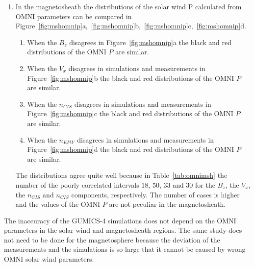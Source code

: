 \documentclass[linenumbers,draft]{agujournal}
\begin{document}
\begin{enumerate}
\item In the magnetosheath the distributions of the solar wind P calculated from OMNI parameters can be compared in Figure~\ref{fig:mshomnip}a,~\ref{fig:mshomnip}b,~\ref{fig:mshomnip}c,~\ref{fig:mshomnip}d.
\begin{enumerate}
\item When the $B_{z}$ disagrees in Figure~\ref{fig:mshomnip}a the black and red distributions of the OMNI $P$ are similar.

\item When the $V_{x}$ disagrees in simulations and measurements in Figure~\ref{fig:mshomnip}b the black and red distributions of the OMNI $P$ are similar.

\item When the $n_{CIS}$ disagrees in simulations and measurements in Figure~\ref{fig:mshomnip}c the black and red distributions of the OMNI $P$ are similar.

\item When the $n_{EFW}$ disagrees in simulations and measurements in Figure~\ref{fig:mshomnip}d the black and red distributions of the OMNI $P$ are similar.
\end{enumerate}
The distributions agree quite well because in Table~\ref{tab:omnimsh} the number of the poorly correlated intervals 18, 50, 33 and 30 for the $B_{z}$, the $V_{x}$, the $n_{CIS}$ and $n_{CIS}$ components, respectively. The number of cases is higher and the values of the OMNI $P$ are not peculiar in the magnetosheath.
\end{enumerate}
The inaccuracy of the GUMICS-4 simulations does not depend on the OMNI parameters in the solar wind and magnetosheath regions. The same study does not need to be done for the magnetosphere because the deviation of the measurements and the simulations is so large that it cannot be caused by wrong OMNI solar wind parameters.
\end{document}
